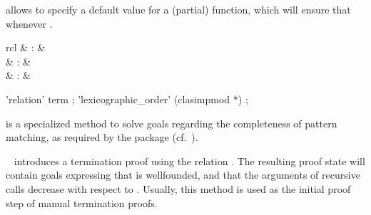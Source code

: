 \begin{isabellebody}
\begin{isamarkuptext}
\begin{description}
  \item {} allows to specify a default value for a
  (partial) function, which will ensure that 
  whenever .

  \end{description}%
\end{isamarkuptext}%
\isamarkuptrue%
%
\isamarkuptrue%
%
\begin{isamarkuptext}%
\begin{matharray}{rcl}
    \hypertarget{method.HOL.pat-completeness}{\hyperlink{method.HOL.pat-completeness}{\mbox{}}} & : &  \\
    \hypertarget{method.HOL.relation}{\hyperlink{method.HOL.relation}{\mbox{}}} & : &  \\
    \hypertarget{method.HOL.lexicographic-order}{\hyperlink{method.HOL.lexicographic-order}{\mbox{}}} & : &  \\
  \end{matharray}

  \begin{rail}
    'relation' term
    ;
    'lexicographic\_order' (clasimpmod *)
    ;
  \end{rail}

  \begin{description}

  \item \hyperlink{method.HOL.pat-completeness}{\mbox{}} is a specialized method to
  solve goals regarding the completeness of pattern matching, as
  required by the \hyperlink{command.HOL.function}{\mbox{}} package (cf.\
  \cite{isabelle-function}).

  \item \hyperlink{method.HOL.relation}{\mbox{}}~ introduces a termination
  proof using the relation .  The resulting proof state will
  contain goals expressing that  is wellfounded, and that the
  arguments of recursive calls decrease with respect to \isa{R}.
  Usually, this method is used as the initial proof step of manual
  termination proofs.


\end{description}
\end{isamarkuptext}
\end{isabellebody}
